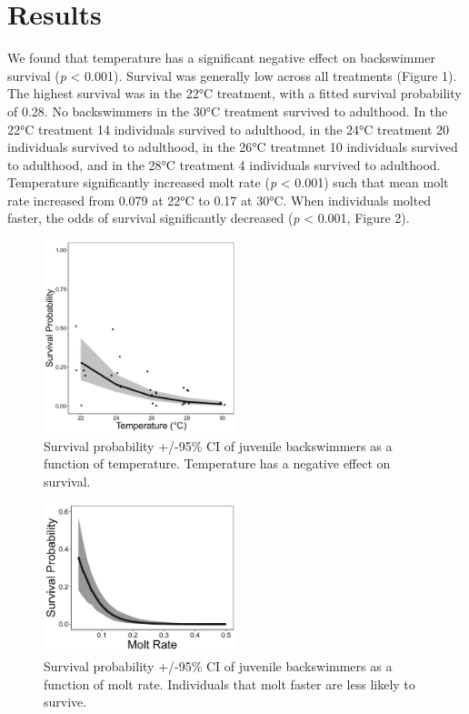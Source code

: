 \documentclass[
]{article}
\begin{document}
\section{Results}\label{results}

We found that temperature has a significant negative effect on
backswimmer survival (\emph{p} \textless{} 0.001). Survival was
generally low across all treatments (Figure 1). The highest survival was
in the 22°C treatment, with a fitted survival probability of 0.28. No
backswimmers in the 30°C treatment survived to adulthood. In the 22°C
treatment 14 individuals survived to adulthood, in the 24°C treatment 20
individuals survived to adulthood, in the 26°C treatmnet 10 individuals
survived to adulthood, and in the 28°C treatment 4 individuals survived
to adulthood. Temperature significantly increased molt rate (\emph{p}
\textless{} 0.001) such that mean molt rate increased from 0.079 at 22°C
to 0.17 at 30°C. When individuals molted faster, the odds of survival
significantly decreased (\emph{p} \textless{} 0.001, Figure 2).

\begin{figure}
\centering
\includegraphics[width=0.5\textwidth,height=\textheight]{../03_figs/survival_plot.png}
\caption{Survival probability +/-95\% CI of juvenile backswimmers as a
function of temperature. Temperature has a negative effect on survival.}
\end{figure}

\begin{figure}
\centering
\includegraphics[width=0.5\textwidth,height=\textheight]{../03_figs/moltrate_survival_plot.png}
\caption{Survival probability +/-95\% CI of juvenile backswimmers as a
function of molt rate. Individuals that molt faster are less likely to
survive.}
\end{figure}
\end{document}
